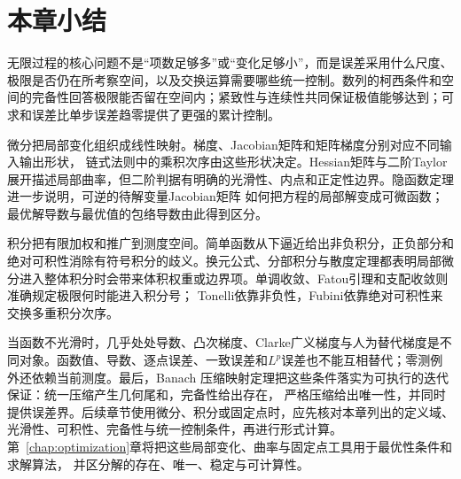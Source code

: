 \section{本章小结}
\label{sec:analysis-summary}

无限过程的核心问题不是“项数足够多”或“变化足够小”，而是误差采用什么尺度、极限是否仍在所考察空间，以及交换运算需要哪些统一控制。数列的柯西条件和空间的完备性回答极限能否留在空间内；紧致性与连续性共同保证极值能够达到；可求和误差比单步误差趋零提供了更强的累计控制。

微分把局部变化组织成线性映射。梯度、Jacobian矩阵和矩阵梯度分别对应不同输入输出形状， 链式法则中的乘积次序由这些形状决定。Hessian矩阵与二阶Taylor展开描述局部曲率，但二阶判据有明确的光滑性、内点和正定性边界。隐函数定理进一步说明，可逆的待解变量Jacobian矩阵 如何把方程的局部解变成可微函数；最优解导数与最优值的包络导数由此得到区分。

积分把有限加权和推广到测度空间。简单函数从下逼近给出非负积分，正负部分和绝对可积性消除有符号积分的歧义。换元公式、分部积分与散度定理都表明局部微分进入整体积分时会带来体积权重或边界项。单调收敛、Fatou引理和支配收敛则准确规定极限何时能进入积分号； Tonelli依靠非负性，Fubini依靠绝对可积性来交换多重积分次序。

当函数不光滑时，几乎处处导数、凸次梯度、Clarke广义梯度与人为替代梯度是不同对象。函数值、导数、逐点误差、一致误差和$L^p$误差也不能互相替代；零测例外还依赖当前测度。最后，Banach 压缩映射定理把这些条件落实为可执行的迭代保证：统一压缩产生几何尾和，完备性给出存在， 严格压缩给出唯一性，并同时提供误差界。后续章节使用微分、积分或固定点时，应先核对本章列出的定义域、光滑性、可积性、完备性与统一控制条件，再进行形式计算。
第~\ref{chap:optimization}章将把这些局部变化、曲率与固定点工具用于最优性条件和求解算法，
并区分解的存在、唯一、稳定与可计算性。
